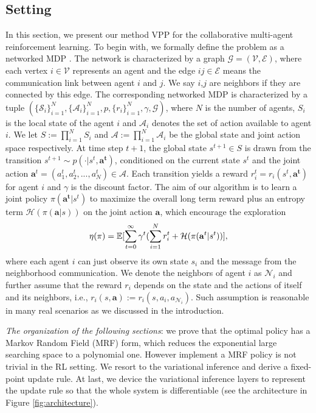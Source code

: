 \documentclass[11pt,a4paper]{article}
\theoremstyle{definition}
\begin{document}
\subsection{Setting}
In this section, we present our method VPP for the collaborative multi-agent reinforcement learning.  To begin with, we formally define the problem as a networked MDP \citep{zhang2018fully}. The network is characterized by a graph $\mathcal{G}=(\mathcal{V}, \mathcal{E})$, where each vertex $i\in \mathcal{V}$ represents an agent and the edge $ij\in \mathcal{E}$ means the communication link between agent $i$ and $j$. We say $i$,$j$ are neighbors if they are connected by this edge.  The corresponding networked MDP is characterized by a tuple $( \{\mathcal{S}_{i}\}_{i=1}^{N}, \{\mathcal{A}_{i}\}_{i=1}^{N}, p,\{r_i\}_{i=1}^{N}, \gamma, \mathcal{G})$, where  $N$ is the number of agents,  $S_i$ is the local state of the agent $i$ and $\mathcal{A}_i$ denotes the set of action available to agent $i$. We let $S:=\prod_{i=1}^{N} S_i$ and $\mathcal{A}:= \prod_{i=1}^{N} \mathcal{A}_i$ be the global state and joint action space respectively. At time step $t+1$, the global state $s^{t+1}\in S$ is drawn from the transition   $s^{t+1}\sim p(\cdot| s^{t}, \mathbf{a^t})$, conditioned on the current state $s^t$ and the joint action $\mathbf{a}^t=(a_1^t, a_2^t,...,a_N^t) \in \mathcal{A}.$  Each transition yields a reward $r_i^t=r_i(s^t, \mathbf{a^t})$ for agent $i$ and $\gamma$ is the discount factor.  The aim of our algorithm is to learn a joint policy $ \pi( \mathbf{a^t}| s^t)$ to maximize the overall long term reward plus an entropy term $\mathcal{H}( \pi (\mathbf{a}|s))$ on the joint action $\mathbf{a}$, which encourage the exploration \citep{ziebart2008maximum,haarnoja2018softac}
$$\eta(\pi)=\mathbb{E}{\Large[\sum_{t=0}^{\infty}\gamma^t ( \sum_{i=1}^{N}   r_i^{t}+ \mathcal{H}(\pi(\mathbf{a}^t|s^t)) \Large] },$$ where each agent $i$ can just observe its own state $s_i$ and the message from the neighborhood communication. We denote the neighbors of agent $i$ as $\mathcal{N}_i$ and further assume that the reward $r_i$ depends on the state and the actions of itself and its neighbors, i.e., $r_i(s,\mathbf{a}):=r_i(s,a_i, a_{\mathcal{N}_i})$. 
Such assumption is reasonable in many real scenarios as we discussed in the introduction.

\emph{The organization of the following sections}: we prove that the optimal policy has  a Markov Random Field (MRF) form, which reduces the exponential large searching space to a polynomial one. However implement a MRF policy is not trivial in the RL setting.  We resort to the variational inference and derive a fixed-point update rule. At last, we device the variational inference layers to represent the update rule so that the whole system is differentiable (see the architecture in Figure \ref{fig:architecture}).
\end{document}
